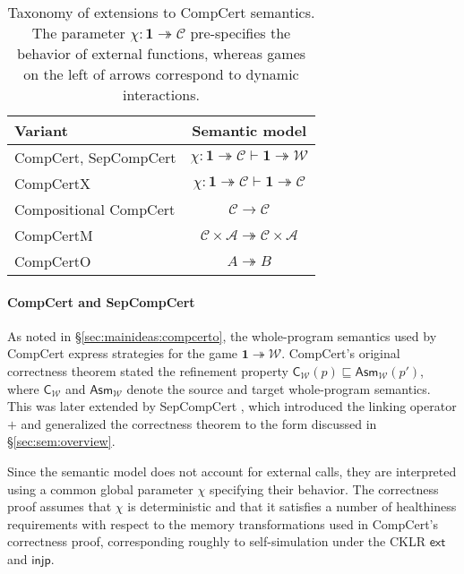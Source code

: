 \documentclass[sigplan,10pt,review,anonymous]{acmart}\settopmatter{printfolios=true,printccs=false,printacmref=false}
\newcommand{\kw}[1]{\ensuremath{ \mathsf{#1} }}
\begin{document}
\begin{table} %
  \begin{tabular}{lc}
    \hline
    Variant & Semantic model \\
    \hline
    CompCert, SepCompCert &
      $\chi : \mathbf{1} \twoheadrightarrow \mathcal{C}
       \vdash \mathbf{1} \twoheadrightarrow \mathcal{W}$ \\
    CompCertX &
      $\chi : \mathbf{1} \twoheadrightarrow \mathcal{C} \vdash
       \mathbf{1} \twoheadrightarrow \mathcal{C}$ \\
    Compositional CompCert &
      $\mathcal{C} \rightarrow \mathcal{C}$ \\
    CompCertM &
      $\mathcal{C} \times \mathcal{A} \twoheadrightarrow
       \mathcal{C} \times \mathcal{A}$ \\
    CompCertO &
      $A \twoheadrightarrow B$ \\
    \hline
  \end{tabular}
  \vspace{1ex}
  \caption{Taxonomy of extensions to CompCert semantics.
    The parameter $\chi : \mathbf{1} \twoheadrightarrow \mathcal{C}$
    pre-specifies the behavior of external functions,
    whereas games on the left of arrows
    correspond to dynamic interactions.
  }
  \label{tbl:compcerts}
\end{table}

\paragraph{CompCert and SepCompCert} %

As noted in \S\ref{sec:mainideas:compcerto},
the whole-program semantics used by CompCert
express strategies for the game
$\mathbf{1} \twoheadrightarrow \mathcal{W}$.
CompCert's original correctness theorem
stated the refinement property
$\kw{C}_\mathcal{W}(p) \sqsubseteq \kw{Asm}_\mathcal{W}(p')$,
where $\kw{C}_\mathcal{W}$ and $\kw{Asm}_\mathcal{W}$
denote the source and target whole-program semantics.
This was later extended by SepCompCert \cite{sepcompcert},
which introduced the linking operator $+$
and generalized the correctness theorem to
the form discussed in \S\ref{sec:sem:overview}.

Since the semantic model does not account
for external calls,
they are interpreted %
using a common global parameter $\chi$
specifying their behavior.
The correctness proof assumes that $\chi$ is deterministic
and that it satisfies a number of healthiness requirements
with respect to the memory transformations
used in CompCert's correctness proof,
corresponding roughly to self-simulation
under the CKLR $\kw{ext}$ and $\kw{injp}$.
\end{document}
